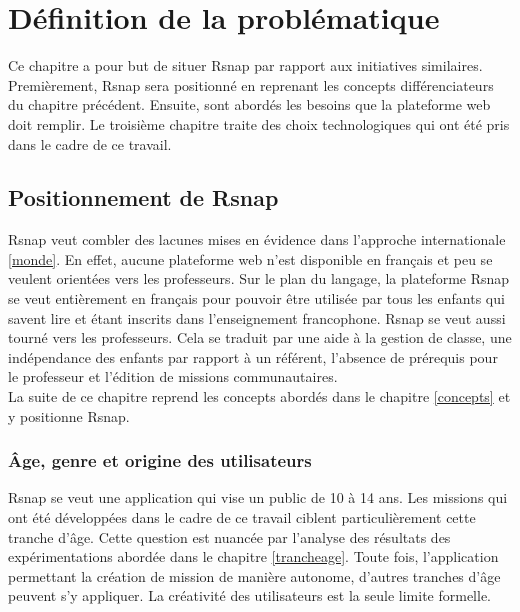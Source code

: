 \chapter{Définition de la problématique}
Ce chapitre a pour but de situer Rsnap par rapport aux initiatives similaires. Premièrement, Rsnap sera positionné en reprenant les concepts différenciateurs du chapitre précédent. Ensuite, sont abordés les besoins que la plateforme web doit remplir. Le troisième chapitre traite des choix technologiques qui ont été pris dans le cadre de ce travail.

\section{Positionnement de Rsnap}
Rsnap veut combler des lacunes mises en évidence dans l'approche internationale \ref{monde}. En effet, aucune plateforme  web n'est disponible en français et peu se veulent orientées vers les professeurs. Sur le plan du langage, la plateforme Rsnap se veut entièrement en français pour pouvoir être utilisée par tous les enfants qui savent lire et étant inscrits dans l'enseignement francophone. Rsnap se veut aussi tourné vers les professeurs. Cela se traduit par une aide à la gestion de classe, une indépendance des enfants par rapport à un référent, l'absence de prérequis pour le professeur et l'édition de missions communautaires.\\

La suite de ce chapitre reprend les concepts abordés dans le chapitre \ref{concepts} et y positionne Rsnap.

\subsection{Âge, genre et origine des utilisateurs} 
Rsnap se veut une application qui vise un public de 10 à 14 ans. Les missions qui ont été développées dans le cadre de ce travail ciblent particulièrement cette tranche d'âge. Cette question est nuancée par l'analyse des résultats des expérimentations abordée dans le chapitre \ref{trancheage}. %
Toute fois, l'application permettant la création de mission de manière autonome, d'autres tranches d'âge peuvent s'y appliquer. La créativité des utilisateurs est la seule limite formelle.\\

